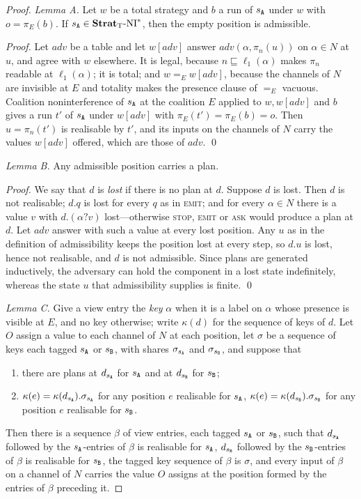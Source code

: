 \documentclass[preprint,5p,twocolumn]{elsarticle}
\begin{document}
\begin{proof}
  \emph{Lemma A.} Let $w$ be a total strategy and $b$ a run of $s_{\mathtt{A}}$ under $w$ with
  $o = \pi_E(b)$. If $s_{\mathtt{A}} \in \mathbf{Strat}_{\mathrm{T}}\text{-}\mathrm{NI}^*$, then the empty position is admissible.

  \emph{Proof.} Let $adv$ be a table and let $w[adv]$ answer $adv(\alpha, \pi_n(u))$ on
  $\alpha \in N$ at $u$, and agree with $w$ elsewhere. It is legal, because
  $n \sqsubseteq \ell_1(\alpha)$ makes $\pi_n$ readable at $\ell_1(\alpha)$; it is total; and
  $w =_E w[adv]$, because the channels of $N$ are invisible at $E$ and totality makes the presence
  clause of $=_E$ vacuous. Coalition noninterference of $s_{\mathtt{A}}$ at the coalition $E$ applied to
  $w, w[adv]$ and $b$ gives a run $t'$ of $s_{\mathtt{A}}$ under $w[adv]$ with $\pi_E(t') = \pi_E(b) = o$. Then
  $u = \pi_n(t')$ is realisable by $t'$, and its inputs on the channels of $N$ carry the values
  $w[adv]$ offered, which are those of $adv$. \qed

  \emph{Lemma B.} Any admissible position carries a plan.

  \emph{Proof.} We say that $d$ is \emph{lost} if there is no plan at $d$. Suppose $d$ is lost. Then $d$
  is not realisable; $d.q$ is lost for every $q$ as in \textsc{emit}; and for every $\alpha \in N$
  there is a
  value $v$ with $d.(\alpha ? v)$ lost---otherwise \textsc{stop}, \textsc{emit} or \textsc{ask}
  would produce a plan at $d$. Let
  $adv$ answer with such a value at every lost position. Any $u$ as in the definition of admissibility
  keeps the position lost at every step, so $d.u$ is lost, hence not realisable, and $d$ is not
  admissible. Since plans are generated inductively, the adversary can hold the component in a lost state indefinitely, whereas the state $u$ that
  admissibility supplies is finite. \qed

  \emph{Lemma C.} Give a view entry the \emph{key} $\alpha$ when it is a label on
  $\alpha$ whose presence is visible at $E$, and no key otherwise; write $\kappa(d)$ for the
  sequence of keys of $d$. Let $O$ assign a value to each channel of $N$ at each position, let
  $\sigma$ be a sequence of keys each tagged $s_{\mathtt{A}}$ or $s_{\mathtt{B}}$, with shares $\sigma_{s_{\mathtt{A}}}$ and
  $\sigma_{s_{\mathtt{B}}}$, and suppose that
  \begin{enumerate}[(1)]
    \item there are plans at $d_{s_{\mathtt{A}}}$ for $s_{\mathtt{A}}$ and at $d_{s_{\mathtt{B}}}$ for $s_{\mathtt{B}}$;
    \item $\kappa(e) = \kappa(d_{s_{\mathtt{A}}}).\sigma_{s_{\mathtt{A}}}$ for any position $e$ realisable for $s_{\mathtt{A}}$,
      $\kappa(e) = \kappa(d_{s_{\mathtt{B}}}).\sigma_{s_{\mathtt{B}}}$ for any position $e$ realisable for $s_{\mathtt{B}}$.
  \end{enumerate}
  Then there is a sequence $\beta$ of view entries, each tagged $s_{\mathtt{A}}$ or $s_{\mathtt{B}}$, such that $d_{s_{\mathtt{A}}}$
  followed by the $s_{\mathtt{A}}$-entries of $\beta$ is realisable for $s_{\mathtt{A}}$, $d_{s_{\mathtt{B}}}$ followed by the
  $s_{\mathtt{B}}$-entries of $\beta$ is realisable for $s_{\mathtt{B}}$, the tagged key sequence of $\beta$ is $\sigma$,
  and every input of $\beta$ on a channel of $N$ carries the value $O$ assigns at the position
  formed by the entries of $\beta$ preceding it.


\end{proof}
\end{document}
